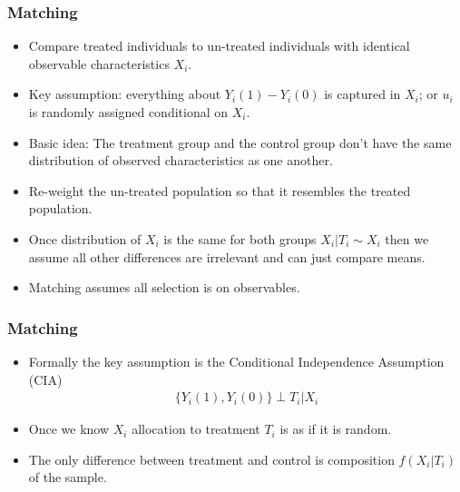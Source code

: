 \documentclass[xcolor=pdftex,dvipsnames,table,mathserif,aspectratio=169]{beamer}
\begin{document}
\begin{frame}
\frametitle{Matching}
\begin{itemize}
\item Compare treated individuals to un-treated individuals with identical observable characteristics $X_i$.
\item Key assumption: everything about $Y_i(1) - Y_i(0)$ is captured in $X_i$; or $u_i$ is randomly assigned conditional on $X_i$.
\item Basic idea: The treatment group and the control group don't have the same distribution of observed characteristics as one another. 
\item \alert{Re-weight} the un-treated population so that it resembles the treated population.
\item Once distribution of $X_i$ is the same for both groups $ X_i | T_i \sim X_i$ then we assume all other differences are irrelevant and can just compare means.
\item Matching assumes \alert{all selection is on observables}.
\end{itemize}
\end{frame}

\begin{frame}
\frametitle{Matching}
\begin{itemize}
\item Formally the key assumption is the \alert{Conditional Independence Assumption (CIA)}
\begin{eqnarray*}
\{Y_i(1),Y_i(0)\}  \perp T_i | X_i
\end{eqnarray*}
\item Once we know $X_i$ allocation to treatment $T_i$ is as if it is random.
\item The only difference between treatment and control is composition $f(X_i | T_i)$ of the sample.
\end{itemize}
\end{frame}
\end{document}
